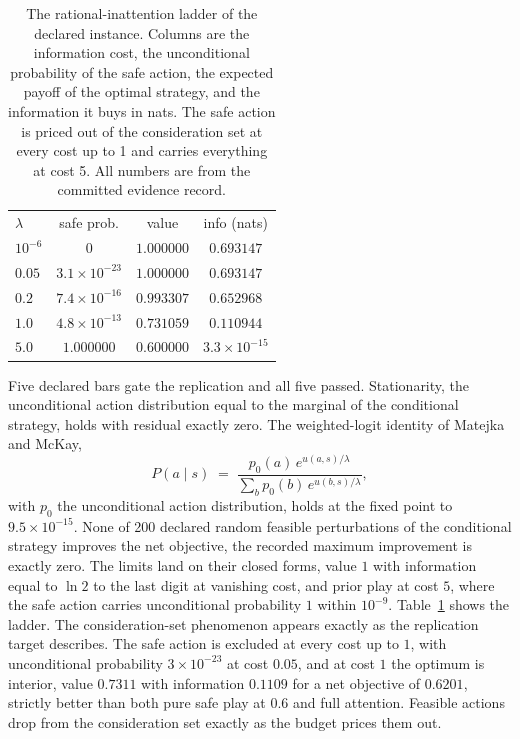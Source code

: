 \documentclass[aps,pre,reprint,nofootinbib]{revtex4-2}
\begin{document}
\begin{table}[t]
\caption{The rational-inattention ladder of the declared instance.
Columns are the information cost, the unconditional probability of
the safe action, the expected payoff of the optimal strategy, and the
information it buys in nats.  The safe action is priced out of the
consideration set at every cost up to 1 and carries everything at
cost 5.  All numbers are from the committed evidence record.}
\label{tab:gd5}
\begin{ruledtabular}
\begin{tabular}{lccc}
$\lambda$ & safe prob. & value & info (nats) \\
\colrule
$10^{-6}$ & $0$                   & $1.000000$ & $0.693147$ \\
$0.05$    & $3.1\times10^{-23}$   & $1.000000$ & $0.693147$ \\
$0.2$     & $7.4\times10^{-16}$   & $0.993307$ & $0.652968$ \\
$1.0$     & $4.8\times10^{-13}$   & $0.731059$ & $0.110944$ \\
$5.0$     & $1.000000$            & $0.600000$ & $3.3\times10^{-15}$ \\
\end{tabular}
\end{ruledtabular}
\end{table}

Five declared bars gate the replication and all five passed.
Stationarity, the unconditional action distribution equal to the
marginal of the conditional strategy, holds with residual exactly
zero.  The weighted-logit identity of Matejka and McKay,
\begin{equation}
  P(a \mid s) \;=\;
  \frac{p_0(a)\, e^{u(a,s)/\lambda}}
       {\sum_b p_0(b)\, e^{u(b,s)/\lambda}},
  \label{eq:mm}
\end{equation}
with $p_0$ the unconditional action distribution, holds at the fixed
point to $9.5\times10^{-15}$.  None of 200 declared random feasible
perturbations of the conditional strategy improves the net objective,
the recorded maximum improvement is exactly zero.  The limits land on
their closed forms, value $1$ with information equal to $\ln 2$ to
the last digit at vanishing cost, and prior play at cost $5$, where
the safe action carries unconditional probability $1$ within
$10^{-9}$.  Table~\ref{tab:gd5} shows the ladder.  The
consideration-set phenomenon appears exactly as the replication
target describes.  The safe action is excluded at every cost up to
$1$, with unconditional probability $3\times10^{-23}$ at cost
$0.05$, and at cost $1$ the optimum is interior, value
$0.7311$ with information $0.1109$ for a net objective of $0.6201$,
strictly better than both pure safe play at $0.6$ and full
attention.  Feasible actions drop from the consideration set exactly
as the budget prices them out.
\end{document}
